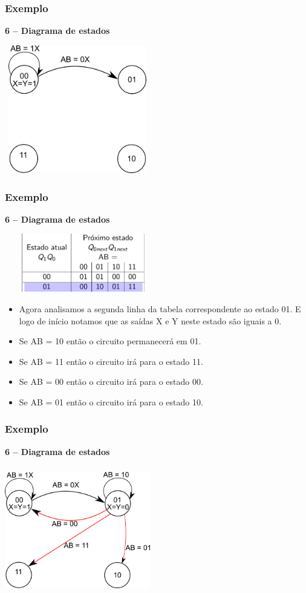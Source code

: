 \documentclass{beamer}
\begin{document}
\begin{frame}
  \frametitle{Exemplo}
  \textbf{6 – Diagrama de estados}
   \begin{center}
    \includegraphics[height = 2.2in, width = 2.5in]{Diagrama_de_estado_ex3.png}
   \end{center}
\end{frame}

\begin{frame}
  \frametitle{Exemplo}
  \textbf{6 – Diagrama de estados}
  \begin{center}
   \includegraphics[height = 1in, width = 2.7in]{Diagrama_estado_tabela_2.png}
  \end{center}

  \begin{itemize}
   \item Agora analisamos a segunda linha da tabela correspondente ao estado 01. E logo de início notamos que as saídas X e Y neste estado são iguais a 0.\pause
   \item Se AB = 10 então o circuito permanecerá em 01. \pause
   \item Se AB = 11 então o circuito irá para o estado 11. \pause
   \item Se AB = 00 então o circuito irá para o estado 00. \pause
   \item Se AB = 01 então o circuito irá para o estado 10. 
  \end{itemize} 
\end{frame}

\begin{frame}
  \frametitle{Exemplo}
  \textbf{6 – Diagrama de estados}
   \begin{center}
    \includegraphics[height = 2.2in, width = 2.5in]{Diagrama_de_estado_ex4.png}
   \end{center}
\end{frame}
\end{document}
